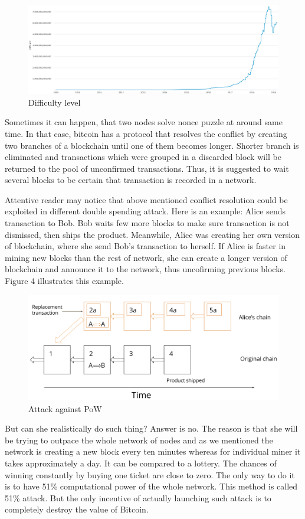 \documentclass[conference,compsoc]{IEEEtran}
\begin{document}
\begin{figure}[h]
  \centering
  \includegraphics[width=.45\textwidth]{graphics/target.png}
  \caption{Difficulty level}
  \label{fig:fig3}
\end{figure}


Sometimes it can happen, that two nodes solve nonce puzzle at around same time. 
In that case, bitcoin has a protocol that resolves the conflict by creating two branches of a blockchain until one of them becomes longer.
Shorter branch is eliminated and transactions which were grouped in a discarded block will be returned to the pool of unconfirmed transactions.
Thus, it is suggested to wait several blocks to be certain that transaction is recorded in a network.

Attentive reader may notice that above mentioned conflict resolution could be exploited in different double spending attack. 
Here is an example: Alice sends transaction to Bob. 
Bob waits few more blocks to make sure transaction is not dismissed, then ships the product.
Meanwhile, Alice was creating her own version of blockchain, where she send Bob's transaction to herself. 
If Alice is faster in mining new blocks than the rest of network, she can create a longer version of blockchain and announce it to the network, thus uncofirming previous blocks.
Figure 4 illustrates this example.

\begin{figure}[h]
  \centering
  \includegraphics[width=.45\textwidth]{graphics/pow.png}
  \caption{Attack against PoW}
  \label{fig:fig4}
\end{figure}

But can she realistically do such thing? 
Answer is no.
The reason is that she will be trying to outpace the whole network of nodes and as we mentioned the network is creating a new block every ten minutes whereas for individual miner it takes approximately a day. 
It can be compared to a lottery. 
The chances of winning constantly by buying one ticket are close to zero. 
The only way to do it is to have 51\% computational power of the whole network.
This method is called 51\% attack. 
But the only incentive of actually launching such attack is to completely destroy the value of Bitcoin. 
\end{document}

